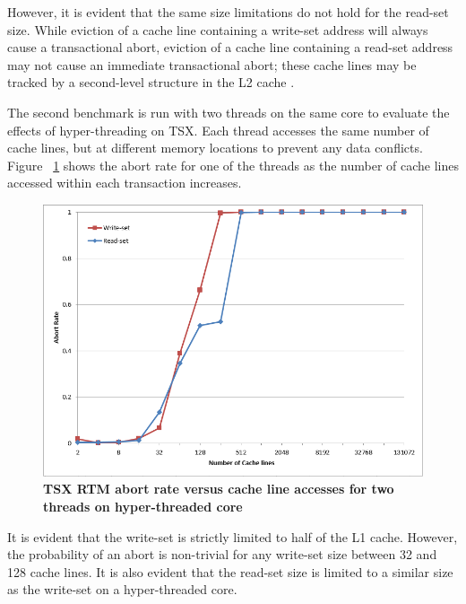 \documentclass[a4paper]{article}
\begin{document}
\indent 
However, it is evident that the same size limitations do not hold for
the read-set size.  While eviction of a cache line containing a write-set address will
always cause a transactional abort, eviction of a cache line containing a
read-set address may not cause an immediate transactional abort; these cache
lines may be tracked by a second-level structure in the L2 cache
\cite{intel_opt_man}.
\par

\indent 
The second benchmark is run with two threads on the same core to
evaluate the effects of hyper-threading on TSX.  Each thread accesses the same
number of cache lines, but at different memory locations to prevent any data
conflicts. Figure ~\ref{fig:trx_size_ht} shows the abort rate for one 
of the threads as the number of cache lines accessed within each transaction
increases.
\par

\begin{figure}[H]
    \centering
    \graphicspath{ {./figures/} }
    \includegraphics[width=\textwidth,height=\textheight,keepaspectratio]{trx_size_ht}
    \caption{\textbf{TSX RTM abort rate versus cache line accesses for two 
    threads on hyper-threaded core}}
    \label{fig:trx_size_ht}
\end{figure}

\indent 
It is evident that the write-set is strictly limited to half of the L1
cache.  However, the probability of an abort is non-trivial for any write-set
size between 32 and 128 cache lines.  It is also evident that the read-set size
is limited to a similar size as the write-set on a hyper-threaded core.
\par
\end{document}

